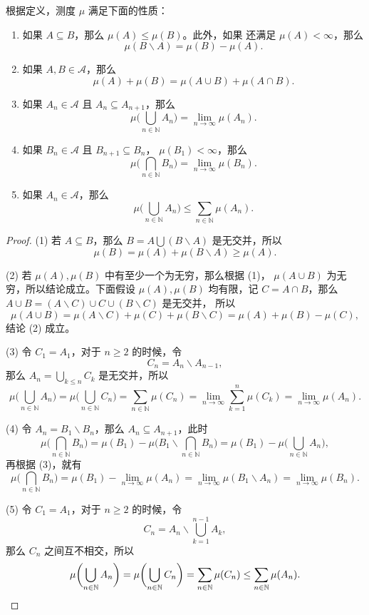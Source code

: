 \documentclass[fontset=none]{Notes}
\begin{document}
\begin{proposition}[测度的性质]
  根据定义，测度 $\mu$ 满足下面的性质：
  \begin{enumerate}
    \item 如果 $A\subseteq B$，那么 $\mu(A)\leq\mu(B)$。此外，如果
    还满足 $\mu(A)<\infty$，那么
    \[
        \mu(B \smallsetminus A)=\mu(B)-\mu(A).
    \]
    \item 如果 $A,B\in \mathcal{A}$，那么
    \[
      \mu(A)+\mu(B)=\mu(A\cup B)+\mu(A\cap B).  
    \]
    \item 如果 $A_n\in \mathcal{A}$ 且 $A_n\subseteq A_{n+1}$，那么
    \[
      \mu\biggl(\bigcup_{n\in \mathbb{N}}A_n\biggr)  
      =\lim_{n\to\infty}\mu(A_n).
    \]
    \item 如果 $B_n\in \mathcal{A}$ 且 $B_{n+1}\subseteq B_n$，
    $\mu(B_1)<\infty$，那么
    \[
      \mu\biggl(\bigcap_{n\in \mathbb{N}}B_n\biggr)  
      =\lim_{n\to\infty}\mu(B_n).
    \]
    \item 如果 $A_n\in \mathcal{A}$，那么
    \[
      \mu\biggl(\bigcup_{n\in \mathbb{N}}A_n\biggr)\leq \sum_{n\in \mathbb{N}}\mu(A_n).
    \]
  \end{enumerate}
\end{proposition}
\begin{proof}
  (1) 若 $A\subseteq B$，那么 $B=A\bigcup (B \smallsetminus A)$ 是无交并，所以
  \[
    \mu(B)=\mu(A)+\mu(B \smallsetminus A)\geq \mu(A).  
  \]

  (2) 若 $\mu(A),\mu(B)$ 中有至少一个为无穷，那么根据 (1)，
  $\mu(A\cup B)$ 为无穷，所以结论成立。下面假设
  $\mu(A),\mu(B)$ 均有限，记 $C=A\cap B$，那么
  $A\cup B=(A \smallsetminus C)\cup C\cup(B \smallsetminus C)$ 是无交并，
  所以
  \[
    \mu(A\cup B)=\mu(A \smallsetminus C)+\mu(C)+\mu(B \smallsetminus C)
    =\mu(A)+\mu(B)-\mu(C),
  \]
  结论 (2) 成立。

  (3) 令 $C_1=A_1$，对于 $n\geq 2$ 的时候，令
  \[
    C_n=A_{n}  \smallsetminus A_{n-1},
  \]
  那么 $A_n=\bigcup_{k\leq n}C_k$ 是无交并，所以
  \[
    \mu\biggl(\bigcup_{n\in \mathbb{N}}A_n\biggr)  
    =\mu\biggl(\bigcup_{n\in \mathbb{N}}C_n \biggr)
    =\sum_{n\in \mathbb{N}}\mu(C_n)=\lim_{n\to\infty}
    \sum_{k=1}^n \mu(C_k)=\lim_{n\to\infty} \mu(A_n).
  \]

  (4) 令 $A_n=B_1 \smallsetminus B_n$，那么 $A_n\subseteq A_{n+1}$，此时
  \[
    \mu\biggl(\bigcap_{n\in \mathbb{N}}B_n\biggr)  =
    \mu(B_1)-\mu\biggl(B_1 \smallsetminus\bigcap_{n\in \mathbb{N}}B_n\biggr)
    = \mu(B_1)-\mu\biggl(\bigcup_{n\in \mathbb{N}}A_n\biggr),
  \]
  再根据 (3)，就有
  \[
    \mu\biggl(\bigcap_{n\in \mathbb{N}}B_n\biggr)  =\mu(B_1)-\lim_{n\to\infty}\mu(A_n)
    =\lim_{n\to\infty}\mu(B_1 \smallsetminus A_n)=\lim_{n\to\infty}\mu(B_n).
  \]

  (5) 令 $C_1=A_1$，对于 $n\geq 2$ 的时候，令
  \[
    C_n=A_n \smallsetminus\bigcup_{k=1}^{n-1}A_k,
  \]
  那么 $C_n$ 之间互不相交，所以
  \[
    \mu\biggl(\bigcup_{n\in \mathbb{N}}A_n\biggr)=\mu\biggl(\bigcup_{n\in \mathbb{N}}C_n\biggr)
    =\sum_{n\in \mathbb{N}}\mu(C_n)\leq \sum_{n\in \mathbb{N}}\mu(A_n).\qedhere
  \]
\end{proof}
\end{document}
